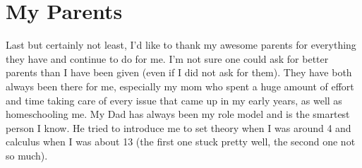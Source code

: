 

\section*{My Parents}
Last but certainly not least, I'd like to thank my awesome parents for everything they have and continue to do for me.
I'm not sure one could ask for better parents than I have been given (even if I did not ask for them).
They have both always been there for me, especially my mom who spent a huge amount of effort and time taking care of every issue that came up in my early years, as well as homeschooling me.
My Dad has always been my role model and is the smartest person I know.
He tried to introduce me to set theory when I was around 4 and calculus when I was about 13 (the first one stuck pretty well, the second one not so much).
